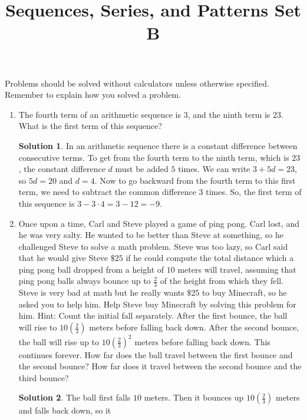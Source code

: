 \documentclass{article}
\title{Sequences, Series, and Patterns Set B}
\date{}
\author{}
\theoremstyle{definition}
\newtheorem*{solution}{Solution}
\begin{document}
    \maketitle
    \noindent Problems should be solved without calculators unless otherwise
    specified. Remember to explain how you solved a problem.
    \begin{enumerate}
        \item The fourth term of an arithmetic sequence is $3$, and the ninth
        term is $23$. What is the first term of this sequence?
        \begin{solution}
            In an arithmetic sequence there is a constant difference between
            consecutive terms. To get from the fourth term to the ninth term,
            which is $23$, the constant difference $d$ must be added $5$ times.
            We can write $3 + 5d = 23$, so $5d = 20$ and $d = 4$. Now to go
            backward from the fourth term to this first term, we need to
            subtract the common difference $3$ times. So, the first term of this
            sequence is $3 - 3 \cdot 4 = 3 - 12 = -9$.
        \end{solution}
        \item Once upon a time, Carl and Steve played a game of ping pong. Carl
        lost, and he was very salty. He wanted to be better than Steve at
        something, so he challenged Steve to solve a math problem. Steve was too
        lazy, so Carl said that he would give Steve $\$25$ if he could compute
        the total distance which a ping pong ball dropped from a height of $10$
        meters will travel, assuming that ping pong balls always bounce up to
        $\frac{2}{3}$ of the height from which they fell. Steve is very bad at
        math but he really wants $\$25$ to buy Minecraft, so he asked you to
        help him. Help Steve buy Minecraft by solving this problem for him.
        Hint: Count the initial fall separately. After the first bounce, the
        ball will rise to $10\left(\frac{2}{3}\right)$ meters before falling
        back down. After the second bounce, the ball will rise up to
        $10\left(\frac{2}{3}\right)^2$ meters before falling back down. This
        continues forever. How far does the ball travel between the first bounce
        and the second bounce? How far does it travel between the second bounce
        and the third bounce?
        \begin{solution}
            The ball first falls $10$ meters. Then it bounces up
            $10\left(\frac{2}{3}\right)$ meters and falls back down, so it

\end{solution}
\end{enumerate}
\end{document}
